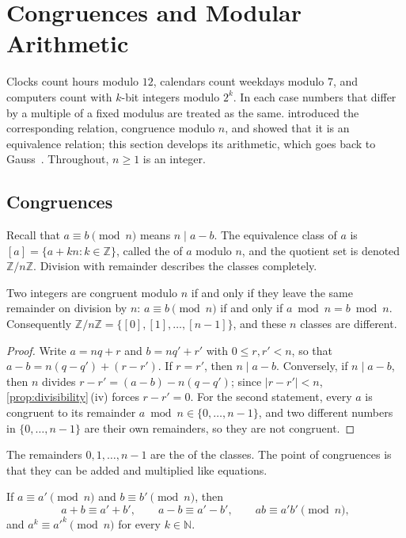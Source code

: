 \section{Congruences and Modular Arithmetic}
\label{sec:congruences}

Clocks count hours modulo $12$, calendars count weekdays modulo $7$, and computers count with $k$-bit integers modulo $2^k$. In each case numbers that differ by a multiple of a fixed modulus are treated as the same.  introduced the corresponding relation, congruence modulo $n$, and showed that it is an equivalence relation; this section develops its arithmetic, which goes back to Gauss~\cite{gauss1801}. Throughout, $n\ge1$ is an integer.

\subsection{Congruences}

Recall that $a\equiv b\pmod n$ means $n\mid a-b$. The equivalence class of $a$ is $[a]=\{a+kn: k\in\mathbb Z\}$, called the  of $a$ modulo $n$, and the quotient set is denoted $\mathbb Z/n\mathbb Z$. Division with remainder describes the classes completely.

\begin{proposition}
\label{prop:congruence-remainder}
Two integers are congruent modulo $n$ if and only if they leave the same remainder on division by $n$: $a\equiv b\pmod n$ if and only if $a\bmod n=b\bmod n$. Consequently $\mathbb Z/n\mathbb Z=\{[0],[1],\ldots,[n-1]\}$, and these $n$ classes are different.
\end{proposition}

\begin{proof}
Write $a=nq+r$ and $b=nq'+r'$ with $0\le r,r'<n$, so that $a-b=n(q-q')+(r-r')$. If $r=r'$, then $n\mid a-b$. Conversely, if $n\mid a-b$, then $n$ divides $r-r'=(a-b)-n(q-q')$; since $|r-r'|<n$, \cref{prop:divisibility}\,(iv) forces $r-r'=0$. For the second statement, every $a$ is congruent to its remainder $a\bmod n\in\{0,\ldots,n-1\}$, and two different numbers in $\{0,\ldots,n-1\}$ are their own remainders, so they are not congruent.
\end{proof}

The remainders $0,1,\ldots,n-1$ are the  of the classes. The point of congruences is that they can be added and multiplied like equations.

\begin{proposition}
\label{prop:congruence-arith}
If $a\equiv a'\pmod n$ and $b\equiv b'\pmod n$, then
\[
a+b\equiv a'+b',\qquad a-b\equiv a'-b',\qquad ab\equiv a'b'\pmod n,
\]
and $a^k\equiv a'^k\pmod n$ for every $k\in\mathbb N$.
\end{proposition}

